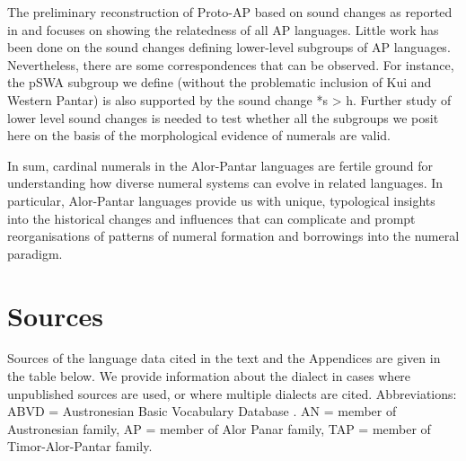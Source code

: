The preliminary reconstruction of Proto-AP based on sound changes as reported in \citet{HoltonEtAl2012} and \citep{HoltonRobinsonTV}focuses on showing the relatedness of all AP languages. Little work has been done on the sound changes defining lower-level subgroups of AP languages. Nevertheless, there are some correspondences that can be observed. For instance, the pSWA subgroup we define (without the problematic inclusion of Kui and Western Pantar) is also supported by the sound change *s {\textgreater} h. Further study of lower level sound changes is needed to test whether all the subgroups we posit here on the basis of the morphological evidence of numerals are valid. 

In sum, cardinal numerals in the Alor-Pantar languages are fertile ground for understanding how diverse numeral systems can evolve in related languages. In particular, Alor-Pantar languages provide us with unique, typological insights into the historical changes and influences that can complicate and prompt reorganisations of patterns of numeral formation and borrowings into the numeral paradigm.


\section{Sources} \label{sec:6:9}
Sources of the language data cited in the text and the Appendices are given in the table below. We provide information about the dialect in cases where unpublished sources are used, or where multiple dialects are cited. Abbreviations: ABVD = Austronesian Basic Vocabulary Database \citep{GreenhillEtAl2005}. AN = member of Austronesian family, AP = member of Alor Panar family, TAP = member of Timor-Alor-Pantar family.





